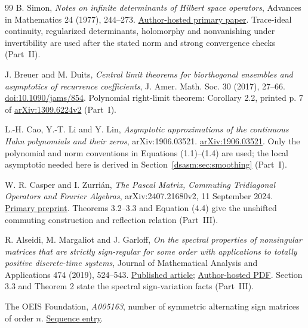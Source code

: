 \documentclass[11pt,letterpaper]{article}
\theoremstyle{remark}\newtheorem{remark}[theorem]{Remark}
\begin{document}
\begin{thebibliography}{99}
B. Simon, \emph{Notes on infinite determinants of Hilbert space
operators}, Advances in Mathematics 24 (1977), 244--273.
\href{https://math.caltech.edu/SimonPapers/74.pdf}{Author-hosted primary paper}.
Trace-ideal continuity, regularized determinants, holomorphy and
nonvanishing under invertibility are used after the stated norm
and strong convergence checks (Part~II).

J. Breuer and M. Duits,
\emph{Central limit theorems for biorthogonal ensembles and asymptotics
of recurrence coefficients}, J. Amer. Math. Soc. 30 (2017), 27--66.
\href{https://doi.org/10.1090/jams/854}{doi:10.1090/jams/854}.
Polynomial right-limit theorem: Corollary 2.2, printed p. 7 of
\href{https://arxiv.org/pdf/1309.6224v2}{arXiv:1309.6224v2} (Part~I).

L.-H. Cao, Y.-T. Li and Y. Lin,
\emph{Asymptotic approximations of the continuous Hahn polynomials
and their zeros}, arXiv:1906.03521.
\href{https://arxiv.org/abs/1906.03521}{arXiv:1906.03521}.
Only the polynomial and norm conventions in Equations (1.1)--(1.4)
are used; the local asymptotic needed here is derived in
Section~\ref{dsasm:sec:smoothing} (Part~I).

W. R. Casper and I. Zurri\'an,
\emph{The Pascal Matrix, Commuting Tridiagonal Operators and Fourier
Algebras}, arXiv:2407.21680v2, 11 September 2024.
\href{https://arxiv.org/html/2407.21680v2}{Primary preprint}.
Theorems 3.2--3.3 and Equation (4.4) give the unshifted commuting
construction and reflection relation (Part~III).

R. Alseidi, M. Margaliot and J. Garloff,
\emph{On the spectral properties of nonsingular matrices that are
strictly sign-regular for some order with applications to totally
positive discrete-time systems}, Journal of Mathematical Analysis
and Applications 474 (2019), 524--543.
\href{https://doi.org/10.1016/j.jmaa.2019.01.062}{Published article};
\href{https://www-home.htwg-konstanz.de/~garloff/JMAA-4.pdf}{Author-hosted PDF}.
Section 3.3 and Theorem 2 state the spectral sign-variation facts (Part~III).

The OEIS Foundation, \emph{A005163}, number of symmetric alternating
sign matrices of order $n$.
\href{https://oeis.org/A005163}{Sequence entry}.
\end{thebibliography}
\endgroup
\end{document}
